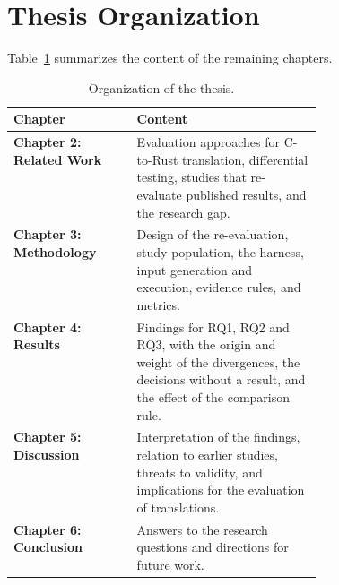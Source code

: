 \section{Thesis Organization}\label{sec:intro-organization}

Table~\ref{tab:intro-organization} summarizes the content of the remaining chapters.

\begin{table}[!htb]
\centering
\small
\caption{Organization of the thesis.}
\label{tab:intro-organization}
\begin{tabularx}{\linewidth}{@{}p{0.40\linewidth}X@{}}
\toprule
Chapter & Content \\
\midrule
\textbf{Chapter 2: Related Work} & Evaluation approaches for C-to-Rust translation, differential testing, studies that re-evaluate published results, and the research gap. \\
\textbf{Chapter 3: Methodology} & Design of the re-evaluation, study population, the harness, input generation and execution, evidence rules, and metrics. \\
\textbf{Chapter 4: Results} & Findings for RQ1, RQ2 and RQ3, with the origin and weight of the divergences, the decisions without a result, and the effect of the comparison rule. \\
\textbf{Chapter 5: Discussion} & Interpretation of the findings, relation to earlier studies, threats to validity, and implications for the evaluation of translations. \\
\textbf{Chapter 6: Conclusion} & Answers to the research questions and directions for future work. \\
\bottomrule
\end{tabularx}
\end{table}
